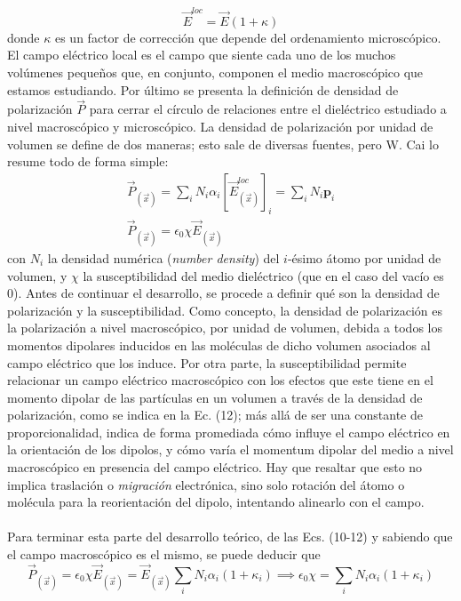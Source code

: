 \documentclass[12pt, notitlepage]{article}
\numberwithin{equation}{section}
\begin{document}
\begin{equation}
\vec{E}^{loc} = \vec{E}(1 + \kappa)
\end{equation}
donde $\kappa$ es un factor de corrección que depende del ordenamiento microscópico. El campo eléctrico local es el campo que siente cada uno de los muchos volúmenes pequeños que, en conjunto, componen el medio macroscópico que estamos estudiando. Por último se presenta la definición de densidad de polarización $\vec{P}$ para cerrar el círculo de relaciones entre el dieléctrico estudiado a nivel macroscópico y microscópico. La densidad de polarización por unidad de volumen se define de dos maneras; esto sale de diversas fuentes, pero W. Cai \cite{Cai} lo resume todo de forma simple:
\begin{gather}
\vec{P}_{(\vec{x})} = \sum_i N_i\alpha_i\left[\vec{E}_{(\vec{x})}^{loc}\right]_i = \sum_i N_i\mathbf{p}_i\\
\vec{P}_{(\vec{x})} = \epsilon_0\chi\vec{E}_{(\vec{x})}
\end{gather}
con $N_i$ la densidad numérica (\textit{number density}) del $i$-ésimo átomo por unidad de volumen, y $\chi$ la susceptibilidad del medio dieléctrico (que en el caso del vacío es 0). Antes de continuar el desarrollo, se procede a definir qué son la densidad de polarización y la susceptibilidad. Como concepto, la densidad de polarización es la polarización a nivel macroscópico, por unidad de volumen, debida a todos los momentos dipolares inducidos en las moléculas de dicho volumen asociados al campo eléctrico que los induce. Por otra parte, la susceptibilidad permite relacionar un campo eléctrico macroscópico con los efectos que este tiene en el momento dipolar de las partículas en un volumen a través de la densidad de polarización, como se indica en la Ec. (12); más allá de ser una constante de proporcionalidad, indica de forma promediada cómo influye el campo eléctrico en la orientación de los dipolos, y cómo varía el momentum dipolar del medio a nivel macroscópico en presencia del campo eléctrico. Hay que resaltar que esto no implica traslación o \textit{migración} electrónica, sino solo rotación del átomo o molécula para la reorientación del dipolo, intentando alinearlo con el campo.\\\\
Para terminar esta parte del desarrollo teórico, de las Ecs. (10-12) y sabiendo que el campo macroscópico es el mismo, se puede deducir que
\begin{equation}
\vec{P}_{(\vec{x})} = \epsilon_0\chi\vec{E}_{(\vec{x})} = \vec{E}_{(\vec{x})}\sum_iN_i\alpha_i(1+\kappa_i) \implies \epsilon_0\chi = \sum_iN_i\alpha_i(1+\kappa_i)
\end{equation}
\end{document}
